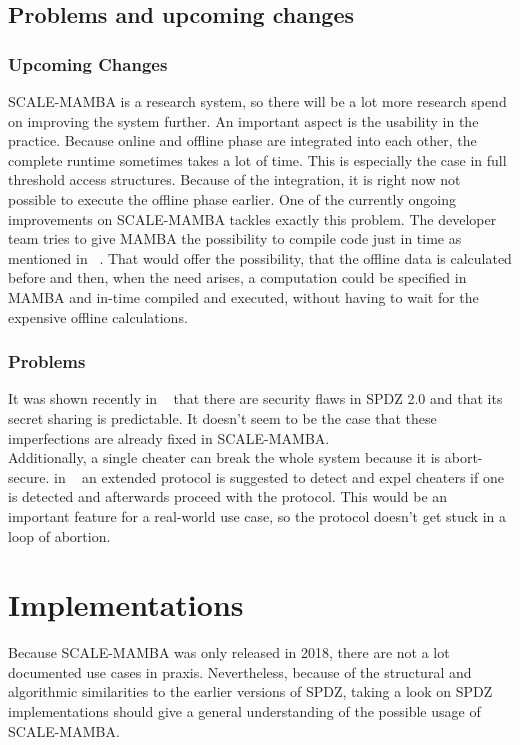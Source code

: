 \documentclass[english,runningheads,a4paper]{llncs}[2018/03/10]
\begin{document}
\subsection{Problems and upcoming changes}
\subsubsection{Upcoming Changes}
SCALE-MAMBA is a research system, so there will be a lot more research spend on improving the system further. An important aspect is the usability in the practice. Because online and offline phase are integrated into each other, the complete runtime sometimes takes a lot of time. This is especially the case in full threshold access structures. Because of the integration, it is right now not possible to execute the offline phase earlier. One of the currently ongoing improvements on SCALE-MAMBA tackles exactly this problem. The developer team tries to give MAMBA the possibility to compile code just in time as mentioned in ~\cite{ScaleMambaDocu}. That would offer the possibility, that the offline data is calculated before and then, when the need arises, a computation could be specified in MAMBA and in-time compiled and executed, without having to wait for the expensive offline calculations.\\

\subsubsection{Problems}
It was shown recently in ~\cite{MPCCompression} that there are security flaws in SPDZ 2.0 and that its secret sharing is predictable. It doesn't seem to be the case that these imperfections are already fixed in SCALE-MAMBA.\\
Additionally, a single cheater can break the whole system because it is abort-secure. in ~\cite{cheaterSPDZ} an extended protocol is suggested to detect and expel cheaters if one is detected and afterwards proceed with the protocol. This would be an important feature for a real-world use case, so the protocol doesn't get stuck in a loop of abortion.

\section{Implementations}
Because SCALE-MAMBA was only released in 2018, there are not a lot documented use cases in praxis. Nevertheless, because of the structural and algorithmic similarities to the earlier versions of SPDZ, taking a look on SPDZ implementations should give a general understanding of the possible usage of SCALE-MAMBA.\\
\end{document}
